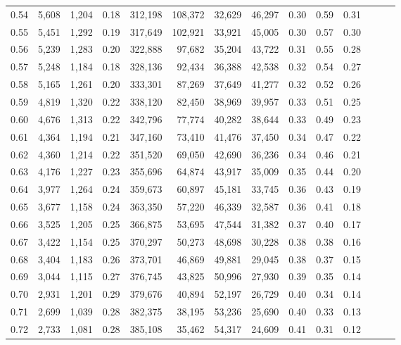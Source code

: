 \begin{tabular}{rrrrrrrrrrrrrr}
0.54 &  5,608 &  1,204 &  0.18 &  312,198 &  108,372 &  32,629 &  46,297 &  0.30 &  0.59 &      0.31 \\
0.55 &  5,451 &  1,292 &  0.19 &  317,649 &  102,921 &  33,921 &  45,005 &  0.30 &  0.57 &      0.30 \\
0.56 &  5,239 &  1,283 &  0.20 &  322,888 &   97,682 &  35,204 &  43,722 &  0.31 &  0.55 &      0.28 \\
0.57 &  5,248 &  1,184 &  0.18 &  328,136 &   92,434 &  36,388 &  42,538 &  0.32 &  0.54 &      0.27 \\
0.58 &  5,165 &  1,261 &  0.20 &  333,301 &   87,269 &  37,649 &  41,277 &  0.32 &  0.52 &      0.26 \\
0.59 &  4,819 &  1,320 &  0.22 &  338,120 &   82,450 &  38,969 &  39,957 &  0.33 &  0.51 &      0.25 \\
0.60 &  4,676 &  1,313 &  0.22 &  342,796 &   77,774 &  40,282 &  38,644 &  0.33 &  0.49 &      0.23 \\
0.61 &  4,364 &  1,194 &  0.21 &  347,160 &   73,410 &  41,476 &  37,450 &  0.34 &  0.47 &      0.22 \\
0.62 &  4,360 &  1,214 &  0.22 &  351,520 &   69,050 &  42,690 &  36,236 &  0.34 &  0.46 &      0.21 \\
0.63 &  4,176 &  1,227 &  0.23 &  355,696 &   64,874 &  43,917 &  35,009 &  0.35 &  0.44 &      0.20 \\
0.64 &  3,977 &  1,264 &  0.24 &  359,673 &   60,897 &  45,181 &  33,745 &  0.36 &  0.43 &      0.19 \\
0.65 &  3,677 &  1,158 &  0.24 &  363,350 &   57,220 &  46,339 &  32,587 &  0.36 &  0.41 &      0.18 \\
0.66 &  3,525 &  1,205 &  0.25 &  366,875 &   53,695 &  47,544 &  31,382 &  0.37 &  0.40 &      0.17 \\
0.67 &  3,422 &  1,154 &  0.25 &  370,297 &   50,273 &  48,698 &  30,228 &  0.38 &  0.38 &      0.16 \\
0.68 &  3,404 &  1,183 &  0.26 &  373,701 &   46,869 &  49,881 &  29,045 &  0.38 &  0.37 &      0.15 \\
0.69 &  3,044 &  1,115 &  0.27 &  376,745 &   43,825 &  50,996 &  27,930 &  0.39 &  0.35 &      0.14 \\
0.70 &  2,931 &  1,201 &  0.29 &  379,676 &   40,894 &  52,197 &  26,729 &  0.40 &  0.34 &      0.14 \\
0.71 &  2,699 &  1,039 &  0.28 &  382,375 &   38,195 &  53,236 &  25,690 &  0.40 &  0.33 &      0.13 \\
0.72 &  2,733 &  1,081 &  0.28 &  385,108 &   35,462 &  54,317 &  24,609 &  0.41 &  0.31 &      0.12 \\

\end{tabular}
